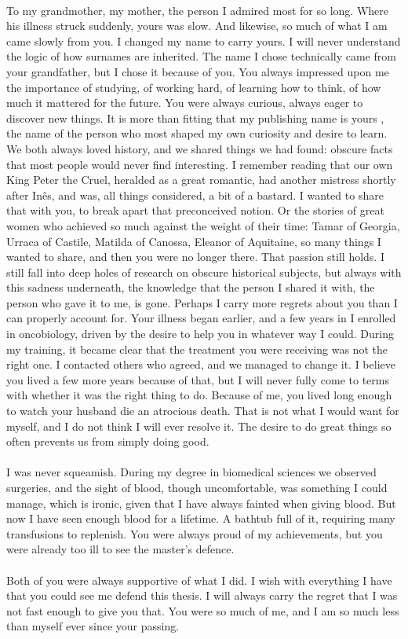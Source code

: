  \\
 To my grandmother, my mother, the person I admired most for so long. Where his illness struck suddenly, yours was slow. And likewise, so much of what I am came slowly from you. I changed my name to carry yours. I will never understand the logic of how surnames are inherited. The name I chose technically came from your grandfather, but I chose it because of you. You always impressed upon me the importance of studying, of working hard, of learning how to think, of how much it mattered for the future. You were always curious, always eager to discover new things. It is more than fitting that my publishing name is yours , the name of the person who most shaped my own curiosity and desire to learn. We both always loved history, and we shared things we had found: obscure facts that most people would never find interesting. I remember reading that our own King Peter the Cruel, heralded as a great romantic, had another mistress shortly after Inês, and was, all things considered, a bit of a bastard. I wanted to share that with you, to break apart that preconceived notion. Or the stories of great women who achieved so much against the weight of their time: Tamar of Georgia, Urraca of Castile, Matilda of Canossa, Eleanor of Aquitaine, so many things I wanted to share, and then you were no longer there. That passion still holds. I still fall into deep holes of research on obscure historical subjects, but always with this sadness underneath, the knowledge that the person I shared it with, the person who gave it to me, is gone.
 Perhaps I carry more regrets about you than I can properly account for. Your illness began earlier, and a few years in I enrolled in oncobiology, driven by the desire to help you in whatever way I could. During my training, it became clear that the treatment you were receiving was not the right one. I contacted others who agreed, and we managed to change it. I believe you lived a few more years because of that, but I will never fully come to terms with whether it was the right thing to do. Because of me, you lived long enough to watch your husband die an atrocious death. That is not what I would want for myself, and I do not think I will ever resolve it. The desire to do great things so often prevents us from simply doing good.
 \\
 \\
 I was never squeamish. During my degree in biomedical sciences we observed surgeries, and the sight of blood, though uncomfortable, was something I could manage, which is ironic, given that I have always fainted when giving blood. But now I have seen enough blood for a lifetime. A bathtub full of it, requiring many transfusions to replenish. You were always proud of my achievements, but you were already too ill to see the master's defence.
 \\
 \\
 Both of you were always supportive of what I did. I wish with everything I have that you could see me defend this thesis. I will always carry the regret that I was not fast enough to give you that. You were so much of me, and I am so much less than myself ever since your passing.
 